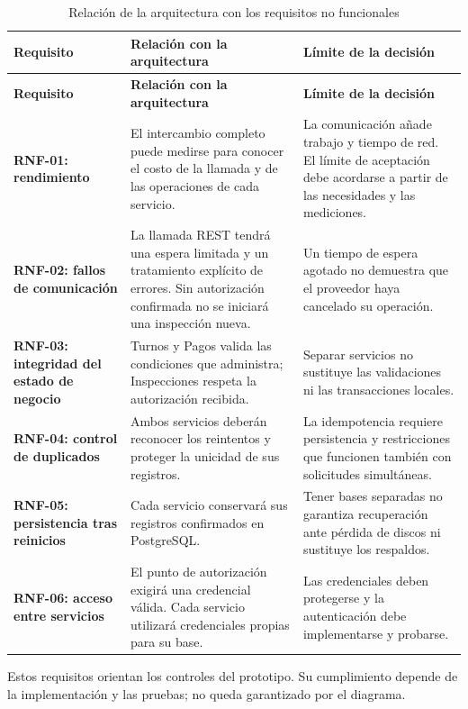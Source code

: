 \documentclass[11pt,a4paper]{article}
\begin{document}
	\begin{xltabular}{\textwidth}{L{3.2cm}XX}
		\caption{Relación de la arquitectura con los requisitos no funcionales}\label{tab:arq-rnf}\\
		\toprule
		\textbf{Requisito} & \textbf{Relación con la arquitectura} & \textbf{Límite de la decisión} \\
		\midrule
		\endfirsthead
		\toprule
		\textbf{Requisito} & \textbf{Relación con la arquitectura} & \textbf{Límite de la decisión} \\
		\midrule
		\endhead
		\bottomrule
		\endfoot
		\textbf{RNF-01: rendimiento} & El intercambio completo puede medirse para conocer el costo de la llamada y de las operaciones de cada servicio. & La comunicación añade trabajo y tiempo de red. El límite de aceptación debe acordarse a partir de las necesidades y las mediciones. \\
		\textbf{RNF-02: fallos de comunicación} & La llamada REST tendrá una espera limitada y un tratamiento explícito de errores. Sin autorización confirmada no se iniciará una inspección nueva. & Un tiempo de espera agotado no demuestra que el proveedor haya cancelado su operación. \\
		\textbf{RNF-03: integridad del estado de negocio} & Turnos y Pagos valida las condiciones que administra; Inspecciones respeta la autorización recibida. & Separar servicios no sustituye las validaciones ni las transacciones locales. \\
		\textbf{RNF-04: control de duplicados} & Ambos servicios deberán reconocer los reintentos y proteger la unicidad de sus registros. & La idempotencia requiere persistencia y restricciones que funcionen también con solicitudes simultáneas. \\
		\textbf{RNF-05: persistencia tras reinicios} & Cada servicio conservará sus registros confirmados en PostgreSQL. & Tener bases separadas no garantiza recuperación ante pérdida de discos ni sustituye los respaldos. \\
		\textbf{RNF-06: acceso entre servicios} & El punto de autorización exigirá una credencial válida. Cada servicio utilizará credenciales propias para su base. & Las credenciales deben protegerse y la autenticación debe implementarse y probarse. \\
	\end{xltabular}
	
	Estos requisitos orientan los controles del prototipo. Su cumplimiento depende de la implementación y las pruebas; no queda garantizado por el diagrama.
	
\end{document}
